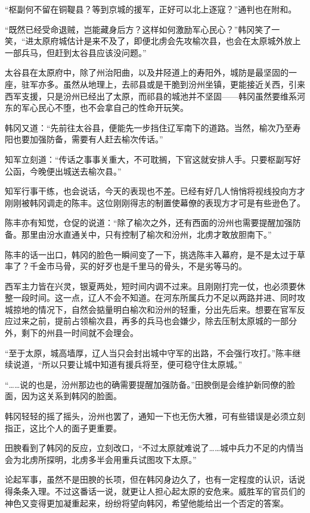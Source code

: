 “枢副何不留在铜鞮县？等到京城的援军，正好可以北上逐寇？”通判也在附和。

“既然已经受命退贼，岂能藏身后方？这样如何激励军心民心？”韩冈笑了一笑，“进太原府城估计是来不及了，即便北虏会先攻榆次县，也会在太原城外放上一部兵马，但赶到太谷县应该没问题。”

太谷县在太原府中，除了州治阳曲，以及井陉道上的寿阳外，城防是最坚固的一座，驻军亦多。虽然从地理上，去祁县或是干脆到汾州坐镇，更能接近关西，引来西军支援，只是汾州已经出了太原，而祁县的城池并不坚固——韩冈虽然要维系河东的军心民心不堕，也不会拿自己的性命开玩笑。

韩冈又道：“先前往太谷县，便能先一步挡住辽军南下的道路。当然，榆次乃至寿阳也要加强防备，需要有人赶去榆次传话。”

知军立刻道：“传话之事事关重大，不可耽搁，下官这就安排人手。只要枢副写好公函，今晚便出城送去榆次县。”

知军行事干练，也会说话，今天的表现也不差。已经有好几人悄悄将视线投向方才刚刚被韩冈调走的陈丰。这位刚刚得志的制置使幕僚的表现方才可是有些逊色了。

陈丰亦有知觉，仓促的说道：“除了榆次之外，还有西面的汾州也需要提醒加强防备。那里由汾水直通关中，只有控制了榆次和汾州，北虏才敢放胆南下。”

陈丰的话一出口，韩冈的脸色一瞬间变了一下，挑选陈丰入幕府，是不是太过于草率了？千金市马骨，买的好歹也是千里马的骨头，不是劣等马的。

西军主力皆在兴灵，银夏两处，短时间内调不过来。且刚刚打完一仗，也必须要休整一段时间。这一点，辽人不会不知道。在河东所属兵力不足以两路并进、同时攻城掠地的情况下，自然会掂量明白榆次和汾州的轻重，分出先后来。想要在官军反应过来之前，提前占领榆次县，再多的兵马也会嫌少，除去压制太原城的一部分外，剩下的州县一时间就不会理会。

“至于太原，城高墙厚，辽人当只会封出城中守军的出路，不会强行攻打。”陈丰继续说道，“所以只要让城中知道有援兵将至，便可稳守住太原城。”

“……说的也是，汾州那边也的确需要提醒加强防备。”田腴倒是会维护新同僚的脸面，因为这关系到韩冈的脸面。

韩冈轻轻的摇了摇头，汾州也罢了，通知一下也无伤大雅，可有些错误是必须立刻指正，这比个人的面子更重要。

田腴看到了韩冈的反应，立刻改口，“不过太原就难说了……城中兵力不足的内情当会为北虏所探明，北虏多半会用重兵试图攻下太原。”

论起军事，虽然不是田腴的长项，但在韩冈身边久了，也有一定程度的认识，话说得条条入理。不过这番话一说，就更让人担心起太原的安危来。威胜军的官员们的神色又变得更加凝重起来，纷纷将望向韩冈，希望他能给出一个否定的答案。

